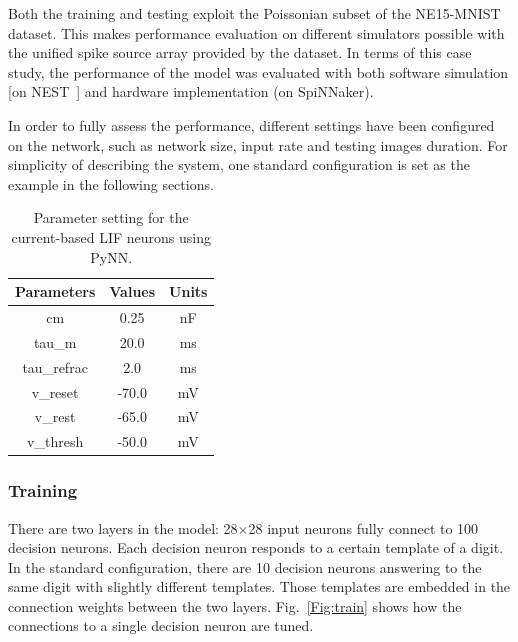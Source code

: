 Both the training and testing exploit the Poissonian subset of the NE15-MNIST dataset.
This makes performance evaluation on different simulators possible with the unified spike source array provided by the dataset. 
In terms of this case study, the performance of the model was evaluated with both software simulation [on NEST~\citep{gewaltig2007nest}] and hardware implementation (on SpiNNaker).

In order to fully assess the performance, different settings have been configured on the network, such as network size, input rate and testing images duration.
For simplicity of describing the system, one standard configuration is set as the example in the following sections.
\begin{table}[hbbp]
\centering
\caption{\label{tbl:pynnSetting}Parameter setting for the current-based LIF neurons using PyNN.}
\bgroup
\def\arraystretch{1.1}
  \begin{tabular}{c|c|c}
  Parameters & Values & Units \\
  \hline
  cm & 0.25 & nF	\\
  tau\_m & 20.0 & ms\\
  tau\_refrac & 2.0 & ms\\
  v\_reset & -70.0 & mV\\
  v\_rest & -65.0 & mV\\
  v\_thresh & -50.0 & mV\\
  \end{tabular}
\egroup
\end{table}

\subsubsection{Training}

There are two layers in the model: 28$\times$28 input neurons fully connect to 100 decision neurons.
Each decision neuron responds to a certain template of a digit.
In the standard configuration, there are 10 decision neurons answering to the same digit with slightly different templates.
Those templates are embedded in the connection weights between the two layers.
Fig.~\ref{Fig:train} shows how the connections to a single decision neuron are tuned.

